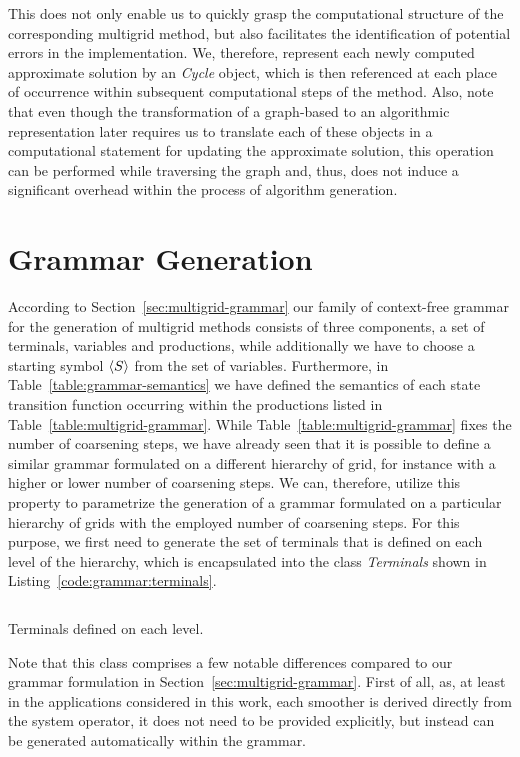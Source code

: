 This does not only enable us to quickly grasp the computational structure of the corresponding multigrid method, but also facilitates the identification of potential errors in the implementation.
We, therefore, represent each newly computed approximate solution by an \emph{Cycle} object, which is then referenced at each place of occurrence within subsequent computational steps of the method.
Also, note that even though the transformation of a graph-based to an algorithmic representation later requires us to translate each of these objects in a computational statement for updating the approximate solution, this operation can be performed while traversing the graph and, thus, does not induce a significant overhead within the process of algorithm generation. 
\section{Grammar Generation}
According to Section~\ref{sec:multigrid-grammar} our family of context-free grammar for the generation of multigrid methods consists of three components, a set of terminals, variables and productions, while additionally we have to choose a starting symbol $\langle S \rangle$ from the set of variables.
Furthermore, in Table~\ref{table:grammar-semantics} we have defined the semantics of each state transition function occurring within the productions listed in Table~\ref{table:multigrid-grammar}.
While Table~\ref{table:multigrid-grammar} fixes the number of coarsening steps, we have already seen that it is possible to define a similar grammar formulated on a different hierarchy of grid, for instance with a higher or lower number of coarsening steps.
We can, therefore, utilize this property to parametrize the generation of a grammar formulated on a particular hierarchy of grids with the employed number of coarsening steps.
For this purpose, we first need to generate the set of terminals that is defined on each level of the hierarchy, which is encapsulated into the class \emph{Terminals} shown in Listing~\ref{code:grammar:terminals}.
\begin{listing}
	\inputminted{python}{evostencils/grammar/terminals.py}
	\caption{Terminals defined on each level.}
	\label{code:grammar:terminals}
\end{listing}
Note that this class comprises a few notable differences compared to our grammar formulation in Section~\ref{sec:multigrid-grammar}.
First of all, as, at least in the applications considered in this work, each smoother is derived directly from the system operator, it does not need to be provided explicitly, but instead can be generated automatically within the grammar.
